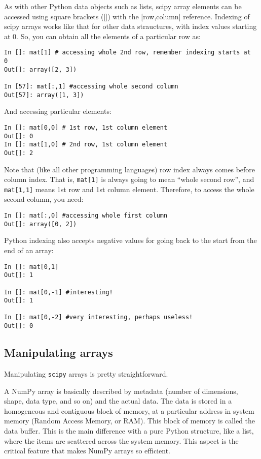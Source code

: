 As with other Python data objects such as lists, scipy array elements 
can be accessed using square brackets ([]) with the [row,column] 
reference. Indexing of scipy arrays works 
like that for other data strauctures, with index values starting at 0. 
So, you can obtain all the elements of a particular row as:
\begin{lstlisting}
In []: mat[1] # accessing whole 2nd row, remember indexing starts at 
0
Out[]: array([2, 3])

In [57]: mat[:,1] #accessing whole second column  
Out[57]: array([1, 3])
\end{lstlisting}

And accessing particular elements: 
\begin{lstlisting}
In []: mat[0,0] # 1st row, 1st column element
Out[]: 0
In []: mat[1,0] # 2nd row, 1st column element
Out[]: 2
\end{lstlisting}
Note that (like all other programming languages) row index always comes 
before column index. That is, {\tt mat[1]} is always going to mean 
``whole second row'', and {\tt mat[1,1]} means 1st row and 1st column 
element. Therefore, to access the whole second column, you need:
\begin{lstlisting}
In []: mat[:,0] #accessing whole first column  
Out[]: array([0, 2])
\end{lstlisting}

\begin{tipbox}
Python indexing also accepts negative values for going back to the 
start from the end of an array:
\begin{lstlisting}
In []: mat[0,1]
Out[]: 1

In []: mat[0,-1] #interesting!
Out[]: 1

In []: mat[0,-2] #very interesting, perhaps useless!
Out[]: 0
\end{lstlisting}
\end{tipbox}

\subsection{Manipulating arrays}
Manipulating {\tt scipy} arrays is pretty straightforward.
 
 
\begin{tipbox}
A NumPy array is basically described by metadata (number of dimensions, shape, data type, and so on) and the actual data. The data is stored in a homogeneous and contiguous block of memory, at a particular address in system memory (Random Access Memory, or RAM). This block of memory is called the data buffer. This is the main difference with a pure Python structure, like a list, where the items are scattered across the system memory. This aspect is the critical feature that makes NumPy arrays so efficient.
\end{tipbox}

